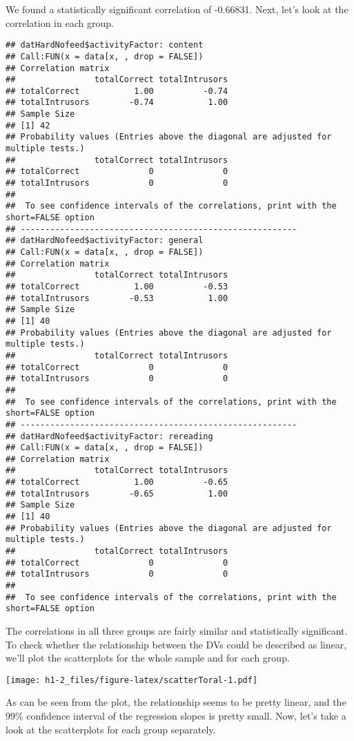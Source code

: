 \documentclass[12pt,]{article}
\begin{document}
We found a statistically significant correlation of -0.66831. Next,
let's look at the correlation in each group.

\begin{verbatim}
## datHardNofeed$activityFactor: content
## Call:FUN(x = data[x, , drop = FALSE])
## Correlation matrix 
##                totalCorrect totalIntrusors
## totalCorrect           1.00          -0.74
## totalIntrusors        -0.74           1.00
## Sample Size 
## [1] 42
## Probability values (Entries above the diagonal are adjusted for multiple tests.) 
##                totalCorrect totalIntrusors
## totalCorrect              0              0
## totalIntrusors            0              0
## 
##  To see confidence intervals of the correlations, print with the short=FALSE option
## -------------------------------------------------------- 
## datHardNofeed$activityFactor: general
## Call:FUN(x = data[x, , drop = FALSE])
## Correlation matrix 
##                totalCorrect totalIntrusors
## totalCorrect           1.00          -0.53
## totalIntrusors        -0.53           1.00
## Sample Size 
## [1] 40
## Probability values (Entries above the diagonal are adjusted for multiple tests.) 
##                totalCorrect totalIntrusors
## totalCorrect              0              0
## totalIntrusors            0              0
## 
##  To see confidence intervals of the correlations, print with the short=FALSE option
## -------------------------------------------------------- 
## datHardNofeed$activityFactor: rereading
## Call:FUN(x = data[x, , drop = FALSE])
## Correlation matrix 
##                totalCorrect totalIntrusors
## totalCorrect           1.00          -0.65
## totalIntrusors        -0.65           1.00
## Sample Size 
## [1] 40
## Probability values (Entries above the diagonal are adjusted for multiple tests.) 
##                totalCorrect totalIntrusors
## totalCorrect              0              0
## totalIntrusors            0              0
## 
##  To see confidence intervals of the correlations, print with the short=FALSE option
\end{verbatim}

The correlations in all three groups are fairly similar and
statistically significant. To check whether the relationship between the
DVs could be described as linear, we'll plot the scatterplots for the
whole sample and for each group.

\texttt{[image: h1-2\_files/figure-latex/scatterToral-1.pdf]}

As can be seen from the plot, the relationship seems to be pretty
linear, and the 99\% confidence interval of the regression slopes is
pretty small. Now, let's take a look at the scatterplots for each group
separately.
\end{document}
